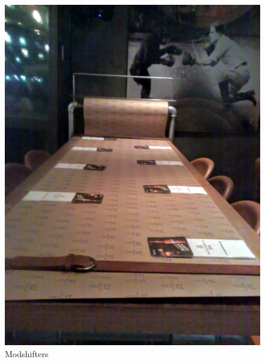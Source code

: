\begin{figure}[!tbp]
\begin{minipage}[b]{0.48\textwidth}
    \includegraphics[width=\textwidth]{project_graphics/collected_modshifters.jpg}
    \caption{Modshifters}
    \label{fig:Modshifters}
  \end{minipage}
\end{figure}



% 